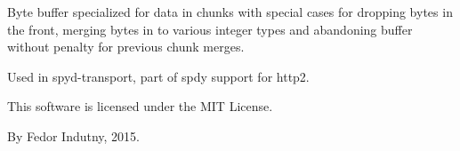 Byte buffer specialized for data in chunks with special cases for dropping bytes in the front, merging bytes in to various integer types and abandoning buffer without penalty for previous chunk merges.

Used in spyd-\/transport, part of spdy support for http2.

This software is licensed under the MIT License.

By Fedor Indutny, 2015. 
